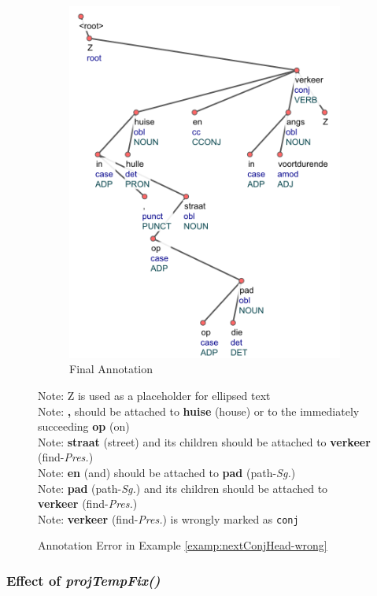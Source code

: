 \begin{figure}[H]
\begin{subfigure}{.5\textwidth}
    \includegraphics[scale=0.69]{img/nextConjHead-wrong2.png}
     \caption{Final Annotation}
    \end{subfigure}
    \caption{Annotation Error in Example \ref{examp:nextConjHead-wrong}}
    Note: Z is used as a placeholder for ellipsed text\\
    Note: \textbf{,} should be attached to \textbf{huise} (house) or to the immediately succeeding \textbf{op} (on)\\
    Note: \textbf{straat} (street) and its children should be attached to \textbf{verkeer} (find-\textit{Pres.})\\
    Note: \textbf{en} (and) should be attached to \textbf{pad} (path-\textit{Sg.}) \\
    Note: \textbf{pad} (path-\textit{Sg.}) and its children should be attached to \textbf{verkeer} (find-\textit{Pres.})\\
    Note: \textbf{verkeer} (find-\textit{Pres.}) is wrongly marked as \verb|conj|
    \label{fig:nextConjHead-wrong}
\end{figure}

\subsubsection{Effect of \textit{projTempFix()}}

